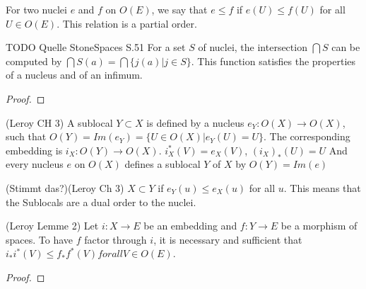 \begin{definition}
    \label{def:nucleus_partial_order}
    \mathlibok
    \leanok
    For two nuclei $e$ and $f$ on $O(E)$, we say that $e \le f$ if $e(U) \le f(U)$ for all $U \in O(E)$.
    This relation is a partial order.
\end{definition}

\begin{lemma} 
    \label{lem:nucleus_intersection}
    \leanok
    TODO Quelle StoneSpaces S.51
    For a set $S$ of nuclei, the intersection $\bigcap S$ can be computed by $\bigcap S(a) = \bigcap \{j(a) | j \in S \}$.
    This function satisfies the properties of a nucleus and of an infimum.
\end{lemma}
\begin{proof}
    \leanok
\end{proof}


\begin{definition}[Sublocal]
(Leroy CH 3)
    \label{def:sublocal}
    \leanok
    A sublocal $Y \subset X$ is defined by a nucleus $e_Y: O(X) \rightarrow O(X)$, such that $O(Y) = Im(e_Y) = \{U \in O(X) | e_Y(U) = U\}$.
    The corresponding embedding is $i_X : O(Y) \rightarrow O(X)$. $i^*_X(V) = e_X(V)$, $(i_X)_*(U) = U$
    And every nucleus $e$ on $O(X)$ defines a sublocal $Y$ of $X$ by $O(Y) = Im(e)$
\end{definition}

\begin{definition}
(Stimmt das?)(Leroy Ch 3)
    \label{def:sublocal_inclusion}
    \leanok
    $X \subset Y$ if $e_Y(u) \le e_X(u)$ for all $u$. This means that the Sublocals are a dual order to the nuclei.
\end{definition}


\begin{lemma}[factorisation]
(Leroy Lemme 2)
    \label{lem:factorisation}
    \leanok
    Let $i : X \rightarrow E$ be an embedding and $f: Y \rightarrow E$ be a morphism of spaces. To have $f$ factor through $i$, it is necessary and sufficient that $i_*i^*(V) \le f_*f^*(V) for all V \in O(E)$.
\end{lemma}
\begin{proof}
    \leanok
\end{proof}

